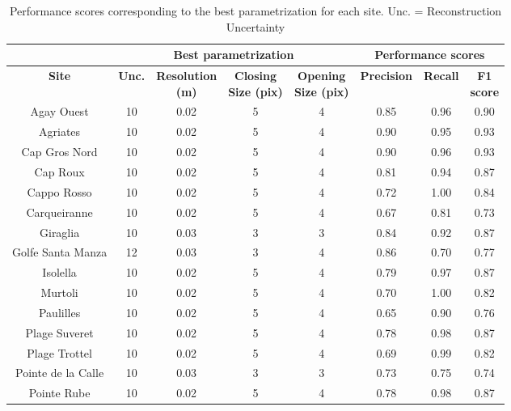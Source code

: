 \begin{table}[H]
  \centering
  \normalsize
  \caption[Performance scores corresponding to the best parametrization for each site.]{Performance scores corresponding to the best parametrization for each site. Unc. = Reconstruction Uncertainty}
  \label{table3.2}
    \begin{tabular}{*{1}{c}|*{4}{c}|*{3}{c}}
        \toprule
        \textbf{} & \multicolumn{4}{c}{\textbf{Best parametrization}} & \multicolumn{3}{c}{\textbf{Performance scores}} \\ 
        \midrule
        \textbf{Site} & \textbf{Unc.} & \makecell{\textbf{Resolution} \\ \textbf{(m)}} & \makecell{\textbf{Closing} \\ \textbf{Size (pix)}} & \makecell{\textbf{Opening} \\ \textbf{Size (pix)}} & \textbf{Precision} & \textbf{Recall} & \makecell{\textbf{F1} \\ \textbf{score}} \\
        \midrule
        Agay Ouest & 10 & 0.02 & 5 & 4 & 0.85 & 0.96 & 0.90 \\
        Agriates & 10 & 0.02 & 5 & 4 & 0.90 & 0.95 & 0.93 \\
        Cap Gros Nord & 10 & 0.02 & 5 & 4 & 0.90 & 0.96 & 0.93 \\
        Cap Roux & 10 & 0.02 & 5 & 4 & 0.81 & 0.94 & 0.87 \\
        Cappo Rosso & 10 & 0.02 & 5 & 4 & 0.72 & 1.00 & 0.84 \\
        Carqueiranne & 10 & 0.02 & 5 & 4 & 0.67 & 0.81 & 0.73 \\
        Giraglia & 10 & 0.03 & 3 & 3 & 0.84 & 0.92 & 0.87 \\
        Golfe Santa Manza & 12 & 0.03 & 3 & 4 & 0.86 & 0.70 & 0.77 \\
        Isolella & 10 & 0.02 & 5 & 4 & 0.79 & 0.97 & 0.87 \\
        Murtoli & 10 & 0.02 & 5 & 4 & 0.70 & 1.00 & 0.82 \\
        Paulilles & 10 & 0.02 & 5 & 4 & 0.65 & 0.90 & 0.76 \\
        Plage Suveret & 10 & 0.02 & 5 & 4 & 0.78 & 0.98 & 0.87 \\
        Plage Trottel & 10 & 0.02 & 5 & 4 & 0.69 & 0.99 & 0.82 \\
        Pointe de la Calle & 10 & 0.03 & 3 & 3 & 0.73 & 0.75 & 0.74 \\
        Pointe Rube & 10 & 0.02 & 5 & 4 & 0.78 & 0.98 & 0.87 \\

\end{tabular}
\end{table}
